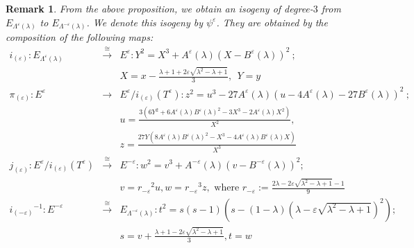 \documentclass[a4paper, 11pt]{article}
\newtheorem{rem}[defn]{Remark}
\theoremstyle{plain}
\newcommand{\?}{\textcolor{red}{??}}
\newcommand{\lm}{\lambda}
\begin{document}
\begin{rem}
\label{isogenybetE}
From the above proposition, we obtain an isogeny of degree-$3$ from $E_{\Lambda^{\varepsilon}(\lm)}$ to $E_{{\Lambda^{-\varepsilon}(\lm)}}$. We denote this isogeny by $\psi^{\varepsilon}$.  They are obtained by the composition of the following maps:
\footnotesize{
\begin{eqnarray*}
   i_{(\varepsilon)}: E_{\Lambda^{\varepsilon}(\lm)} &\overset{\cong}{\rightarrow}& E^{\varepsilon}:{Y}^2={X}^3+A^{\varepsilon}(\lm)\left(X-B^{\varepsilon}(\lm) \right)^2 \ ;\\ &&  X=x-\frac{\lm+1+2\varepsilon\sqrt{{\lm}^2-\lm+1}}{3},\ \ Y=y\\
   \pi_{(\varepsilon)}: E^{\varepsilon}&\rightarrow& E^{\varepsilon}/i_{(\varepsilon)}({T}^{\varepsilon}): z^2=u^3-27A^{\varepsilon}(\lm)\left( u-4A^{\varepsilon}(\lm)-27B^{\varepsilon}(\lm)\right)^2 \ ; \\ && u=\frac{3(6Y^2+6A^{\varepsilon}(\lm)B^{\varepsilon}(\lm)^2-3X^3-2A^{\varepsilon}(\lm)X^2)}{X^2},\\ && z=\frac{27Y\left(8A^{\varepsilon}(\lm)B^{\varepsilon}(\lm)^2-X^3-4A^{\varepsilon}(\lm)B^{\varepsilon}(\lm)X\right)}{X^3}\\
    j_{(\varepsilon)}:E^{\varepsilon}/i_{(\varepsilon)}({T}^{\varepsilon})&\overset{\cong}{\rightarrow}& E^{-\varepsilon}:{w}^2={v}^3+A^{-\varepsilon}(\lm)\left(v-B^{-\varepsilon}(\lm) \right)^2; \\
    && v={r_{-\varepsilon}}^2u, w={r_{-\varepsilon}}^3z, \text{ where } r_{-\varepsilon}:=\frac{2\lm-2\varepsilon\sqrt{{\lm}^2-\lm+1}-1}{9} \\
    {i_{(-\varepsilon)}}^{-1}:E^{-\varepsilon}&\overset{\cong}{\rightarrow}& E_{{\Lambda^{-\varepsilon}(\lm)}}:t^2=s(s-1)\left(s-(1-\lm)\left(\lm-\varepsilon\sqrt{{\lm}^2-\lm+1}\right)^2 \right);\\
    && s=v+\frac{\lm+1-2\varepsilon \sqrt{{\lm}^2-\lm+1}}{3},t=w
\end{eqnarray*}
}

\end{rem}
\end{document}
